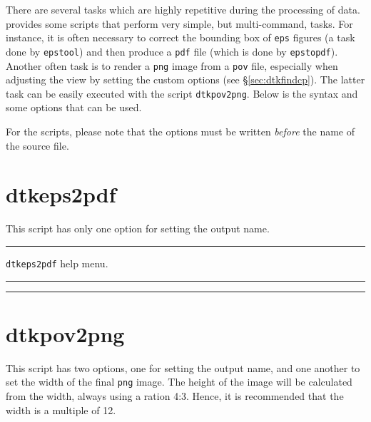 There are several tasks which are highly repetitive during the processing of data. \DTK{} provides some scripts that perform very simple, but multi-command, tasks. For instance, it is often necessary to correct the bounding box of \texttt{eps} figures (a task done by \texttt{epstool}) and then produce a \texttt{pdf} file (which is done by \texttt{epstopdf}). Another often task is to render a \texttt{png} image from a \texttt{pov} file, especially when adjusting the view by setting the custom options (see \S\ref{sec:dtkfindcp}). The latter task can be easily executed with the script \texttt{dtkpov2png}. Below is the syntax and some options that can be used.

For the scripts, please note that the options must be written \textit{before} the name of the source file.

\section{dtkeps2pdf}

This script has only one option for setting the output name.\\
\rule{\textwidth}{1pt}
{\center\texttt{dtkeps2pdf} help menu.\\}
\rule{\textwidth}{1pt}
\begin{footnotesize}
\end{footnotesize}
\rule{\textwidth}{1pt}

\section{dtkpov2png}

This script has two options, one for setting the output name, and one another to set the width of the final \texttt{png} image. The height of the image will be calculated from the width, always using a ration 4:3. Hence, it is recommended that the width is a multiple of 12.

